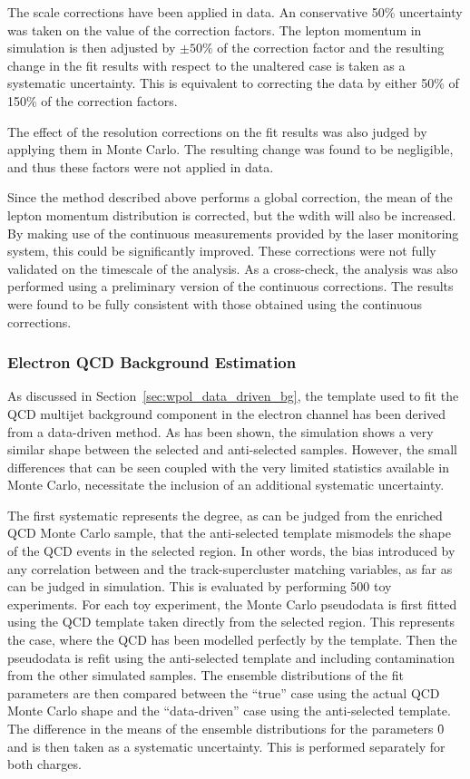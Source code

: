 The scale corrections have been applied in data. An conservative 50\%
uncertainty was taken on the value of the correction factors. The lepton
momentum in simulation is then adjusted by $\pm 50\%$ of the correction factor
and the resulting change in the fit results with respect to the unaltered case
is taken as a systematic uncertainty. This is equivalent to correcting the data
by either 50\% of 150\% of the correction factors.

The effect of the resolution corrections on the fit results was also judged by
applying them in Monte Carlo. The resulting change was found to be negligible,
and thus these factors were not applied in data.

Since the method described above performs a global correction, the mean of the
lepton momentum distribution is corrected, but the wdith will also be
increased. By making use of the continuous measurements provided by the laser
monitoring system, this could be significantly improved. These corrections were
not fully validated on the timescale of the analysis. As a cross-check, the
analysis was also performed using a preliminary version of the continuous
corrections. The results were found to be fully consistent with those obtained
using the continuous corrections.

\subsubsection{Electron \ac{QCD} Background Estimation}
\label{sec:wpol_syst_ele_bgest}
As discussed in Section~\ref{sec:wpol_data_driven_bg}, the template used to fit
the \ac{QCD} multijet background component in the electron channel has been
derived from a data-driven method. As has been shown, the simulation shows a
very similar \LP shape between the selected and anti-selected samples. However,
the small differences that can be seen coupled with the very limited statistics
available in Monte Carlo, necessitate the inclusion of an additional systematic
uncertainty.

The first systematic represents the degree, as can be judged from the enriched
\ac{QCD} Monte Carlo sample, that the anti-selected template mismodels the \LP
shape of the \ac{QCD} events in the selected region. In other words, the bias
introduced by any correlation between \LP and the track-supercluster matching
variables, as far as can be judged in simulation. This is evaluated by
performing 500 toy experiments. For each toy experiment, the Monte Carlo
pseudodata is first fitted using the \ac{QCD} template taken directly from the
selected region. This represents the case, where the \ac{QCD} has been modelled
perfectly by the template. Then the pseudodata is refit using the anti-selected
template and including contamination from the other simulated samples. The
ensemble distributions of the fit parameters are then compared between the
``true'' case using the actual \ac{QCD} Monte Carlo shape and the
``data-driven'' case using the anti-selected template. The difference in the
means of the ensemble distributions for the parameters \f0 and \fLmfR is then
taken as a systematic uncertainty. This is performed separately for both
charges.

